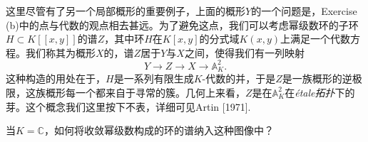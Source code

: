 这里尽管有了另一个局部概形的重要例子，上面的概形$Y$的一个问题是，Exercise {\thethm}(b)中的点与代数的观点相去甚远。为了避免这点，我们可以考虑幂级数环的子环$H\subset K[\![x,y]\!]$的谱$Z$，其中环$H$在$K[x,y]$的分式域$K(x,y)$上满足一个代数方程。我们称其为概形$X$的，谱$Z$居于$Y$与$X$之间，使得我们有一列映射
\[
	Y\to Z\to X\to \mathbb{A}_K^2.
\]
这种构造的用处在于，$H$是一系列有限生成$K$\hyp 代数的并，于是$Z$是一族概形的逆极限，这族概形每一个都来自于寻常的簇。几何上来看，$Z$是在$\mathbb{A}_K^2$在\textit{\'{e}tale拓扑}下的芽。这个概念我们这里按下不表，详细可见Artin [1971].

\begin{exe}
	当$K=\mathbb{C}$，如何将收敛幂级数构成的环的谱纳入这种图像中？
\end{exe}